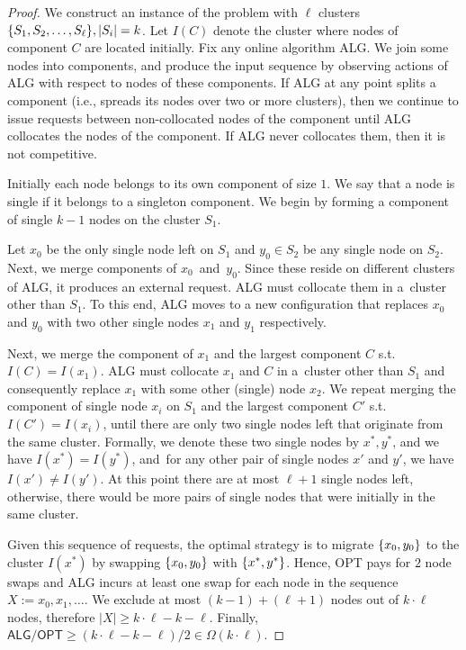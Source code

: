 \documentclass[manuscript,screen=true, review, anonymous]{acmart}
\newcommand{\OPT}{\textsf{OPT}\xspace}
\newcommand{\ALG}{\textsf{ALG}\xspace}
\newcommand{\PPOBRP}{PP-BRP}
\DeclarePairedDelimiter\set{\{}{\}}
\newcommand\maciek[1]{\color{brown}\textbf{\\ Maciek: #1}\color{black}}
\begin{document}
\begin{proof}
	We construct an instance of the problem with $\ell$ clusters 
	$\set{ S_1, S_2,\dots , S_{\ell}}, |S_i|  = k$.
	Let $I(C)$ denote the cluster where nodes of component $C$ are located initially.
	Fix any online algorithm \ALG{}.
  We join some nodes into components, and produce the input sequence by observing actions of \ALG{} with respect to nodes of these components.
	If \ALG{} at any point splits a component
	(i.e., spreads its nodes over two or more clusters),
	then we continue to issue requests between non-collocated nodes of the component until \ALG{} collocates the nodes of the component.
	If \ALG{} never collocates them, then it is not competitive.

  Initially each node belongs to its own component of size $1$.
  We say that a node is single if it belongs to a singleton component.
  We begin by forming a component of single $k-1$ nodes on the cluster $S_1$.
  
	Let $x_0$  be the only single node left on $S_1$ and  $y_0 \in S_2$ be any single node on $S_2$.
	Next,
	we merge components of $x_0$~and~$y_0$.
  Since these reside on different clusters of \ALG{}, it produces an external request.
  \ALG{} must collocate them in a~cluster other than $S_1$.
	To this end,
	\ALG{} moves to a new configuration
	that replaces $x_0$ and $y_0$ with two other single nodes $x_1$ and $y_1$ respectively.
	
	Next,
	we merge the component of $x_1$ and the largest component $C$ s.t.~$I(C) = I(x_1)$.
	\ALG{} must collocate $x_1$ and $C$ in a~cluster other than $S_1$ and
	consequently replace $x_1$ with some other (single) node $x_2$.
	We repeat merging the component of single node $x_i$ on $S_1$ and the largest component $C'$ s.t.~$I(C')=I(x_i)$,
  until there are only two single nodes left that  originate from the same cluster.
	Formally, we denote these two single nodes by $x^*, y^*$, and we have $I(x^*) = I(y^*)$, and~for any other pair of single nodes
	$x'$ and $y'$,
	we have $I(x') \neq I(y')$.
	At this point there are at most $\ell+1$ single nodes left,
	otherwise, there would be more pairs of single nodes that were initially in the same cluster.
	
	Given this sequence of requests,
	the optimal strategy is to migrate $\set{x_0,y_0}$ to the cluster $I(x^*)$ by
	swapping $\set{x_0,y_0}$ with $\set{x^*,y^*}$.
	Hence,
	OPT pays for $2$ node swaps and
	\ALG{} incurs at least one swap for each node in the sequence $X := x_0, x_1,\dots$.
	We exclude at most $(k-1) + ( \ell+1)$ nodes out of $k \cdot \ell$ nodes,
  therefore $|X| \geq k \cdot \ell - k - \ell$.
  Finally, $\ALG/\OPT \geq (k \cdot \ell - k - \ell) / 2\in \Omega(k\cdot\ell)$.
\end{proof}
\end{document}
